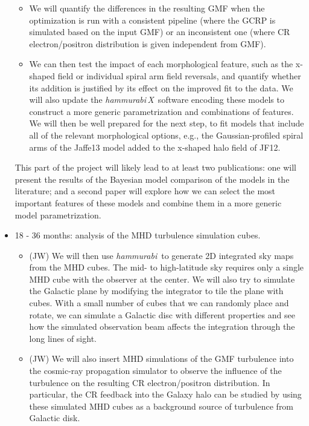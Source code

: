 \documentclass[12pt]{article}
\newcommand{\hammurabi}{\textsl{hammurabi}}
\newcommand{\hammurabix}{\textsl{hammurabi\,X}}
\begin{document}
\begin{itemize}
\begin{itemize}
\item We will quantify the differences in the resulting GMF when the optimization is run with a consistent pipeline (where the GCRP is simulated based on the input GMF) or an inconsistent one (where CR electron/positron distribution is given independent from GMF).  

\item We can then test the impact of each morphological feature, such
  as the x-shaped field or individual spiral arm field reversals, and
  quantify whether its addition is justified by its effect on the
  improved fit to the data. We will also update the \hammurabix\ software encoding
  these models to construct a more generic parametrization and combinations of features. We will then be well prepared for the next step, 
  to fit models that include all 
  of the relevant morphological options, e.g., the Gaussian-profiled
  spiral arms of the Jaffe13 model added to the x-shaped halo field of
  JF12.

\end{itemize}

This part of the project will likely lead to at least two publications:  one will present the results of the Bayesian model comparison of the models in the literature; and a second paper will explore how we can select the most important features of these models and combine them in a more generic model parametrization. 
 
\item 18 - 36 months: analysis of the MHD turbulence simulation
  cubes. 

\begin{itemize}
\item (JW) We will then use \hammurabi\ to generate 2D integrated sky maps
  from the MHD cubes. The mid- to high-latitude sky requires only a
  single MHD cube with the observer at the center. We will also try to
  simulate the Galactic plane by modifying the integrator to tile the
  plane with cubes. With a small number of cubes that we can 
  randomly place and rotate, we can simulate a Galactic disc with different
  properties and see how the simulated observation beam affects the 
  integration through the long lines of sight.

\item (JW) We will also insert MHD simulations of the GMF turbulence into the cosmic-ray propagation simulator to observe the influence of the turbulence on the resulting CR electron/positron distribution.  In particular, the CR feedback into the Galaxy halo can be studied by using these simulated MHD cubes as a background source of  turbulence from Galactic disk. 


\end{itemize}
\end{itemize}
\end{document}
